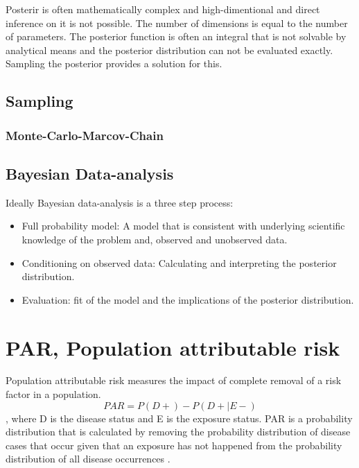 Posterir is often mathematically complex and high-dimentional and direct inference on it is not possible. The number of dimensions is equal to the number of parameters. The posterior function is often an integral that is not solvable by analytical means and the posterior distribution can not be evaluated exactly. Sampling the posterior provides a solution for this.\cite{vandeSchoot2020BayesianSA}

\subsection{Sampling}\label{Sampling}

\subsubsection{Monte-Carlo-Marcov-Chain}\label{MonteCarloMarcovChain}

\subsection{Bayesian Data-analysis}\label{BayesianDataAnalysis}
Ideally Bayesian data-analysis is a three step process: 
\begin{itemize}
    \item Full probability model: A model that is consistent with underlying scientific knowledge of the problem and, observed and unobserved data. 
    \item Conditioning on observed data: Calculating and interpreting the posterior distribution.
    \item Evaluation: fit of the model and the implications of the posterior distribution.
\end{itemize}\cite{Gel2014BayesianDA}

\section{PAR, Population attributable risk}\label{PAR}
Population attributable risk measures the impact of complete removal of a risk factor in a population. 
\begin{equation} \label{PARequation}
PAR = P(D+) - P(D+| E-)
\end{equation}
, where D is the disease status and E is the exposure status. PAR is a probability distribution that is calculated by removing the probability distribution of disease cases that occur given that an exposure has not happened from the probability distribution of all disease occurrences . \cite{Pirikahu2016BayesianMO}

